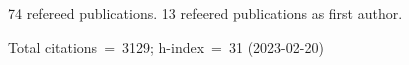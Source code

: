 74 refereed publications. 13 refeered publications as first author.

Total citations~=~3129; h-index~=~31 (2023-02-20)